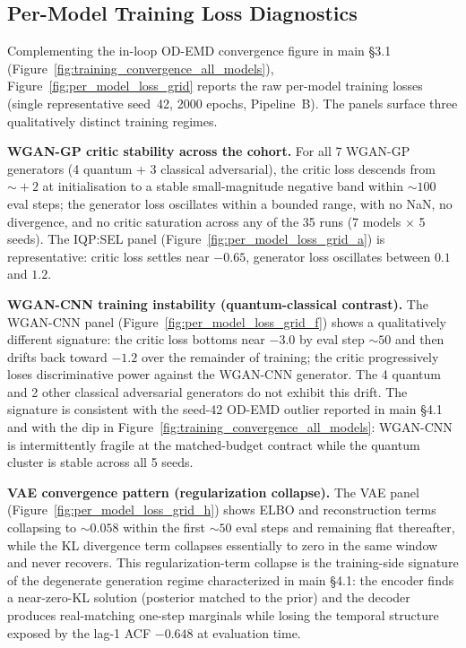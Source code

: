 \subsection{Per-Model Training Loss Diagnostics}
\label{sec:per_model_loss}

Complementing the in-loop OD-EMD convergence figure in main \S3.1
(Figure~\ref{fig:training_convergence_all_models}),
Figure~\ref{fig:per_model_loss_grid} reports the raw per-model training
losses (single representative seed~42, 2000 epochs, Pipeline~B). The
panels surface three qualitatively distinct training regimes.

\textbf{WGAN-GP critic stability across the cohort.} For all 7 WGAN-GP
generators (4 quantum + 3 classical adversarial), the critic loss
descends from $\sim\!+2$ at initialisation to a stable small-magnitude
negative band within $\sim\!100$ eval steps; the generator loss
oscillates within a bounded range, with no NaN, no divergence, and no
critic saturation across any of the 35 runs (7 models $\times$ 5 seeds).
The IQP:SEL panel (Figure~\ref{fig:per_model_loss_grid_a}) is
representative: critic loss settles near $-0.65$, generator loss
oscillates between $0.1$ and $1.2$.

\textbf{WGAN-CNN training instability (quantum-classical contrast).}
The WGAN-CNN panel (Figure~\ref{fig:per_model_loss_grid_f}) shows a
qualitatively different signature: the critic loss bottoms near $-3.0$
by eval step $\sim\!50$ and then drifts back toward $-1.2$ over the
remainder of training; the critic progressively loses discriminative
power against the WGAN-CNN generator. The 4 quantum and 2 other
classical adversarial generators do not exhibit this drift. The
signature is consistent with the seed-42 OD-EMD outlier reported in
main \S4.1 and with the dip in
Figure~\ref{fig:training_convergence_all_models}: WGAN-CNN is
intermittently fragile at the matched-budget contract while the quantum
cluster is stable across all 5 seeds.

\textbf{VAE convergence pattern (regularization collapse).} The VAE
panel (Figure~\ref{fig:per_model_loss_grid_h}) shows ELBO and
reconstruction terms collapsing to $\sim\!0.058$ within the first
$\sim\!50$ eval steps and remaining flat thereafter, while the KL
divergence term collapses essentially to zero in the same window
and never recovers. This regularization-term collapse is the
training-side signature of the degenerate generation regime
characterized in main \S4.1: the encoder finds a near-zero-KL
solution (posterior matched to the prior) and the decoder produces
real-matching one-step marginals while losing the temporal
structure exposed by the lag-1 ACF $-0.648$ at evaluation time.

